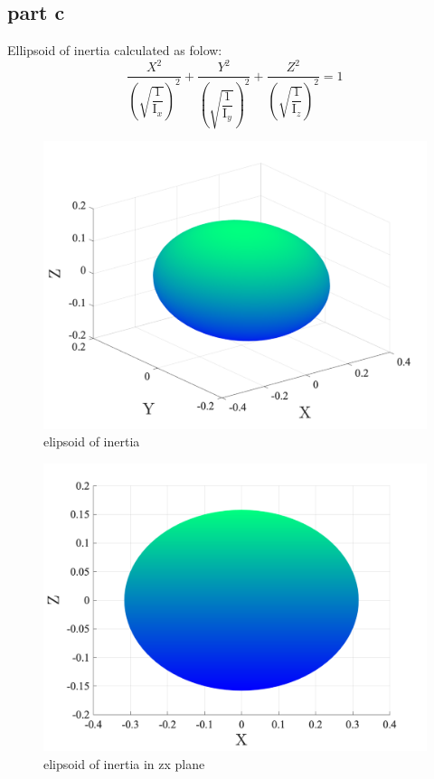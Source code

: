 \subsection{part c}
Ellipsoid of inertia calculated as folow:
\begin{equation}
    \dfrac{X^2}{\left(\sqrt{\dfrac{1}{\mathrm{I}_x}}\right)^2} + 
    \dfrac{Y^2}{\left(\sqrt{\dfrac{1}{\mathrm{I}_y}}\right)^2} + 
    \dfrac{Z^2}{\left(\sqrt{\dfrac{1}{\mathrm{I}_z}}\right)^2} = 1
\end{equation} 

\begin{figure}[H]
    \caption{elipsoid of inertia}
    \centering
    \includegraphics[width=17cm]{../Figure/Q1/3Dof_view_elipsoid_inertia}
\end{figure}

\begin{figure}[H]
    \caption{elipsoid of inertia in zx plane}
    \centering
    \includegraphics[width=12cm]{../Figure/Q1/xz_view_elipsoid_inertia}
\end{figure}

